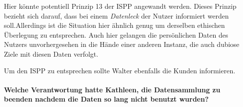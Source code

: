 Hier könnte potentiell Prinzip 13 der ISPP angewandt werden. Dieses Prinzip bezieht sich darauf, dass bei einem \emph{Datenleck} der Nutzer informiert werden soll.Allerdings ist die Situation hier ähnlich genug um derselben ethischen Überlegung zu entsprechen.
Auch hier gelangen die persönlichen Daten des Nutzers unvorhergesehen in die Hände einer anderen Instanz, die auch dubiose Ziele mit diesen Daten verfolgt.

Um den ISPP zu entsprechen sollte Walter ebenfalls die Kunden informieren.

\paragraph*{Welche Verantwortung hatte Kathleen, die Datensammlung zu beenden nachdem die Daten so lang nicht benutzt wurden?}
